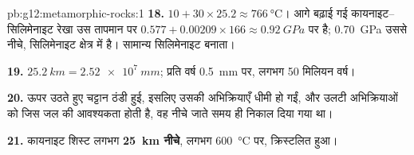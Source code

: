 \begin{solution}{pb:g12:metamorphic-rocks:1}
\textbf{18.} $10 + 30 \times 25.2 \approx \qty{766}{\celsius}$। आगे बढ़ाई गई
कायनाइट--सिलिमेनाइट रेखा उस तापमान पर $0.577 + 0.00209 \times 166
\approx \qty{0.92}{GPa}$ पर है; \qty{0.70}{GPa} उससे नीचे,
सिलिमेनाइट क्षेत्र में है। सामान्य  सिलिमेनाइट बनाता।

\textbf{19.} $\qty{25.2}{km} = \qty{2.52e7}{mm}$; प्रति वर्ष \qty{0.5}{mm} पर,
लगभग 50 मिलियन वर्ष।

\textbf{20.} ऊपर उठते हुए चट्टान ठंडी हुई, इसलिए उसकी अभिक्रियाएँ धीमी हो गईं, और
उलटी अभिक्रियाओं को जिस जल की आवश्यकता होती है, वह नीचे जाते समय ही
निकाल दिया गया था।

\textbf{21.} कायनाइट शिस्ट लगभग \textbf{\qty{25}{km}
नीचे}, लगभग \qty{600}{\celsius} पर, क्रिस्टलित हुआ।
\end{solution}
